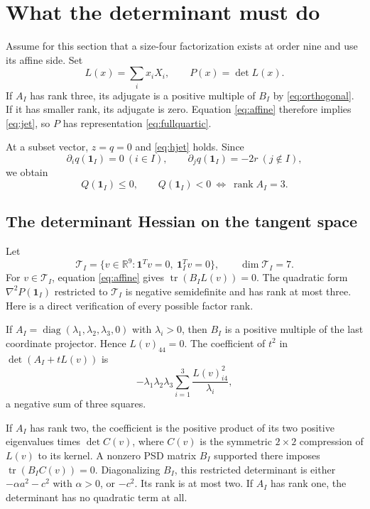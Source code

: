 \documentclass[11pt]{article}
\theoremstyle{remark}\newtheorem{remark}[theorem]{Remark}
\newcommand{\R}{\mathbb R}
\newcommand{\tr}{\operatorname{tr}}
\newcommand{\rank}{\operatorname{rank}}
\newcommand{\diag}{\operatorname{diag}}
\newcommand{\one}{\mathbf 1}
\begin{document}
\section{What the determinant must do}
Assume for this section that a size-four factorization exists at order nine and use its affine side. Set
\[
 L(x)=\sum_i x_iX_i,\qquad P(x)=\det L(x).
\]
If $A_I$ has rank three, its adjugate is a positive multiple of $B_I$ by \eqref{eq:orthogonal}. If it has smaller rank, its adjugate is zero. Equation \eqref{eq:affine} therefore implies \eqref{eq:jet}, so $P$ has representation \eqref{eq:fullquartic}.

At a subset vector, $z=q=0$ and \eqref{eq:hjet} holds. Since
\[
 \partial_iq(\one_I)=0\ (i\in I),\qquad
 \partial_jq(\one_I)=-2r\ (j\notin I),
\]
we obtain
\begin{equation}\label{eq:signQ}
 Q(\one_I)\leq0,\qquad
 Q(\one_I)<0\ \Longleftrightarrow\ \rank A_I=3.
\end{equation}

\subsection{The determinant Hessian on the tangent space}
Let
\[
 \mathcal T_I=\{v\in\R^9:\one^Tv=0,\ \one_I^Tv=0\},\qquad \dim\mathcal T_I=7.
\]
For $v\in\mathcal T_I$, equation \eqref{eq:affine} gives $\tr(B_I L(v))=0$. The quadratic form $\nabla^2P(\one_I)$ restricted to $\mathcal T_I$ is negative semidefinite and has rank at most three. Here is a direct verification of every possible factor rank.

If $A_I=\diag(\lambda_1,\lambda_2,\lambda_3,0)$ with $\lambda_i>0$, then $B_I$ is a positive multiple of the last coordinate projector. Hence $L(v)_{44}=0$. The coefficient of $t^2$ in $\det(A_I+tL(v))$ is
\[
 -\lambda_1\lambda_2\lambda_3
 \sum_{i=1}^3\frac{L(v)_{i4}^2}{\lambda_i},
\]
a negative sum of three squares.

If $A_I$ has rank two, the coefficient is the positive product of its two positive eigenvalues times $\det C(v)$, where $C(v)$ is the symmetric $2\times2$ compression of $L(v)$ to its kernel. A nonzero PSD matrix $B_I$ supported there imposes $\tr(B_I C(v))=0$. Diagonalizing $B_I$, this restricted determinant is either $-\alpha a^2-c^2$ with $\alpha>0$, or $-c^2$. Its rank is at most two. If $A_I$ has rank one, the determinant has no quadratic term at all.
\end{document}
